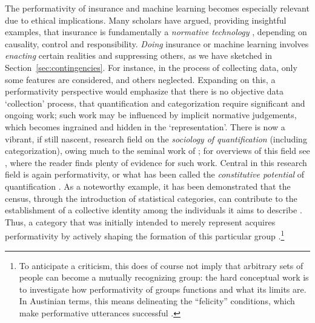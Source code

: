\documentclass[11pt]{article} %
\begin{document}
The performativity of insurance and machine learning becomes especially relevant due to ethical implications. Many scholars have argued, providing insightful examples, that insurance is fundamentally a \textit{normative technology}  \citep{baker2002embracing,glenn2003postmodernism,van2006making,van2007genetic,lehtonen2015producing,tanninen2020contested,prainsack2020shifting}, depending on causality, control and responsibility. \textit{Doing} insurance or machine learning involves \textit{enacting} certain realities and suppressing others, as we have sketched in Section~\ref{sec:contingencies}. For instance, in the process of collecting data, only some features are considered, and others neglected. Expanding on this, a performativity perspective would emphasize that there is no objective data `collection' process, that quantification and categorization require significant and ongoing work; such work may be influenced by implicit normative judgements, which becomes ingrained and hidden in the `representation'. There is now a vibrant, if still nascent, research field on the \textit{sociology of quantification} (including categorization), owing much to the seminal work of \citet{desrosieres1998politics}; for overviews of this field see \citep{espeland2008sociology,diaz2016introduction,mennicken2019s}, where the reader finds plenty of evidence for such work. Central in this research field is again performativity, or what has been called the \textit{constitutive potential} of quantification  \citep{mennicken2019s}. 
As a noteworthy example, it has been demonstrated that the census, through the introduction of statistical categories, can contribute to the establishment of a collective identity among the individuals it aims to describe \citep{lee1993racial,bowker1999sorting,mora2014making}. Thus, a category that was initially intended to merely represent acquires performativity by actively shaping the formation of this particular group \citep{gromme2020doing}.\footnote{To anticipate a criticism, this does of course not imply that arbitrary sets of people can become a mutually recognizing group: the hard conceptual work is to investigate how performativity of groups functions and what its limits are. 
In Austinian terms, this means delineating the ``felicity'' conditions, which make performative utterances successful \citep{brisset2016economics}.
} 
\end{document}
